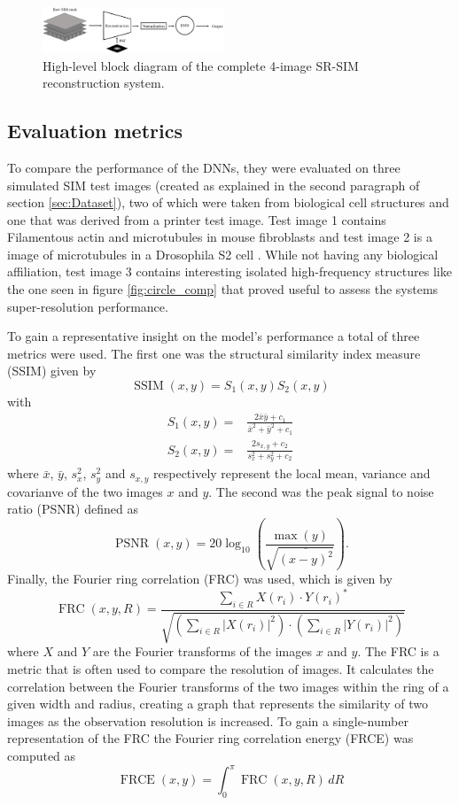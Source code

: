 \documentclass[conference]{IEEEtran}
\begin{document}
\begin{figure}[h]
    \centering
    \includegraphics[width=0.48\textwidth]{images/system_block_diagram.png}
    \caption{High-level block diagram of the complete 4-image SR-SIM reconstruction system.}
    \label{fig:system_block_diagram}
\end{figure}

\subsection{Evaluation metrics}
To compare the performance of the DNNs, they were evaluated on three simulated SIM test images (created as explained in the second paragraph of section \ref{sec:Dataset}), two of which were taken from biological cell structures and one that was derived from a printer test image. Test image 1 contains Filamentous actin and microtubules in mouse fibroblasts \cite{test_image_1_ref} and test image 2 is a image of microtubules in a Drosophila S2 cell \cite{test_image_2_ref}. While not having any biological affiliation, test image 3 contains interesting isolated high-frequency structures like the one seen in figure \ref{fig:circle_comp} that proved useful to assess the systems super-resolution performance.

To gain a representative insight on the model's performance a total of three metrics were used. The first one was the structural similarity index measure (SSIM) \cite{ssim_article} given by
$$\operatorname{SSIM}(x, y) = S_{1}(x, y)S_{2}(x, y)$$
with
\begin{align*} 
    S_{1}(x, y) =& \frac{2\bar{x}\bar{y} + c_{1}}{ \bar{x}^{2} + \bar{y}^{2} + c_{1}}\\ S_{2}(x, y) =& \frac{2s_{x, y} + c_{2}}{s_{x}^{2} + s_{y}^{2} + c_{2}}
\end{align*}
where $\bar{x}$, $\bar{y}$, $s_{x}^{2}$, $s_{y}^{2}$ and $s_{x, y}$ respectively represent the local mean, variance and covarianve of the two images $x$ and $y$. The second was the peak signal to noise ratio (PSNR) \cite{PSNR_paper} defined as
$$\operatorname{PSNR}(x, y)=20\log_{10}\left(\frac{\operatorname{max}(y)}{\sqrt{\overline{(x-y)^2}}}\right).$$
Finally, the Fourier ring correlation (FRC) \cite{FRC_paper} was used, which is given by
$$\operatorname{FRC}(x,y,R)=\frac{\sum_{i\in R}X(r_i)\cdot Y(r_i)^*}{\sqrt{\left(\sum_{i\in R}|X(r_i)|^2\right)\cdot \left(\sum_{i\in R}|Y(r_i)|^2\right)}}$$
where $X$ and $Y$ are the Fourier transforms of the images $x$ and $y$. The FRC is a metric that is often used to compare the resolution of images. It calculates the correlation between the Fourier transforms of the two images within the ring of a given width and radius, creating a graph that represents the similarity of two images as the observation resolution is increased. To gain a single-number representation of the FRC the Fourier ring correlation energy (FRCE) was computed as
$$\operatorname{FRCE}(x,y)=\int_{0}^\pi\operatorname{FRC}(x,y,R)\,dR$$
\end{document}
